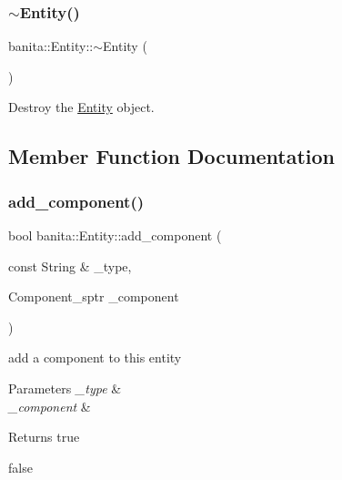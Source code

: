 \subsubsection{\texorpdfstring{$\sim$Entity()}{~Entity()}}
{\footnotesize\ttfamily banita\+::\+Entity\+::$\sim$\+Entity (\begin{DoxyParamCaption}{ }\end{DoxyParamCaption})\hspace{0.3cm}{\ttfamily [inline]}}



Destroy the \mbox{\hyperlink{classbanita_1_1_entity}{Entity}} object. 



\subsection{Member Function Documentation}
\mbox{\label{classbanita_1_1_entity_a37c77bf77f2148e886571ef988b98749}} 
\subsubsection{\texorpdfstring{add\_component()}{add\_component()}}
{\footnotesize\ttfamily bool banita\+::\+Entity\+::add\+\_\+component (\begin{DoxyParamCaption}\item[{const String \&}]{\+\_\+type,  }\item[{Component\+\_\+sptr}]{\+\_\+component }\end{DoxyParamCaption})}



add a component to this entity 


\begin{DoxyParams}{Parameters}
{\em \+\_\+type} & \\
\hline
{\em \+\_\+component} & \\
\hline
\end{DoxyParams}
\begin{DoxyReturn}{Returns}
true 

false 
\end{DoxyReturn}
\mbox{\label{classbanita_1_1_entity_a6e24a4ca55bf664035d39ab229f849c1}} 
